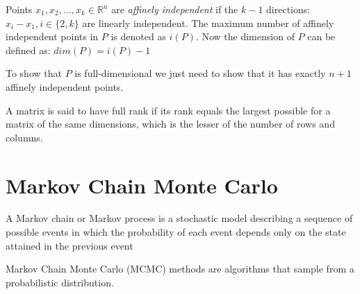    Points $ x_{1}, x_{2}, ... , x_{k} \in \mathbb{R}^n$ are \textit{affinely independent}
   if the $k-1$ directions: 
   $x_{i} - x_{1}, i \in \{2, k\}$
   are linearly independent. 
   The maximum number of affinely independent points in $P$ is denoted as $i(P)$. 
   Now the dimension of $P$ can be defined as:
   $dim(P) = i(P) - 1$

   To show that $P$ is full-dimensional we just need to 
   show that it has exactly $n+1$ affinely independent points. 

   A matrix is said to have full rank if its rank equals the largest possible for a matrix of the same dimensions, which is the lesser of the number of rows and columns. 






\section*{Markov Chain Monte Carlo}
\label{  }

      \begin{definition}
         A Markov chain or Markov process is a stochastic model describing a sequence of possible events in which the probability of each event depends only on the state attained in the previous event
      \end{definition}
   
      Markov Chain Monte Carlo (MCMC) methods are algorithms that sample from a probabilistic distribution. 


